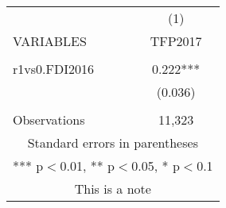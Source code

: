 \documentclass[]{article}
\begin{document}
\begin{tabular}{lc} \hline
 & (1) \\
VARIABLES & TFP2017 \\ \hline
 &  \\
r1vs0.FDI2016 & 0.222*** \\
 & (0.036) \\
 &  \\
 Observations & 11,323 \\ \hline
\multicolumn{2}{c}{ Standard errors in parentheses} \\
\multicolumn{2}{c}{ *** p$<$0.01, ** p$<$0.05, * p$<$0.1} \\
\multicolumn{2}{c}{ This is a note} \\
\end{tabular}
\end{document}
